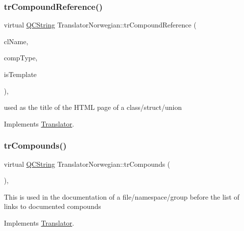 \subsubsection{\texorpdfstring{trCompoundReference()}{trCompoundReference()}}
{\footnotesize\ttfamily virtual \mbox{\hyperlink{class_q_c_string}{Q\+C\+String}} Translator\+Norwegian\+::tr\+Compound\+Reference (\begin{DoxyParamCaption}\item[{const char $\ast$}]{cl\+Name,  }\item[{\mbox{\hyperlink{class_class_def_ae70cf86d35fe954a94c566fbcfc87939}{Class\+Def\+::\+Compound\+Type}}}]{comp\+Type,  }\item[{bool}]{is\+Template }\end{DoxyParamCaption})\hspace{0.3cm}{\ttfamily [inline]}, {\ttfamily [virtual]}}

used as the title of the H\+T\+ML page of a class/struct/union 

Implements \mbox{\hyperlink{class_translator}{Translator}}.

\mbox{\label{class_translator_norwegian_a78c133664ddcd9b886e4fd65be643e93}} 
\subsubsection{\texorpdfstring{trCompounds()}{trCompounds()}}
{\footnotesize\ttfamily virtual \mbox{\hyperlink{class_q_c_string}{Q\+C\+String}} Translator\+Norwegian\+::tr\+Compounds (\begin{DoxyParamCaption}{ }\end{DoxyParamCaption})\hspace{0.3cm}{\ttfamily [inline]}, {\ttfamily [virtual]}}

This is used in the documentation of a file/namespace/group before the list of links to documented compounds 

Implements \mbox{\hyperlink{class_translator}{Translator}}.

\mbox{\label{class_translator_norwegian_a69a708b9c415de38064383a2f190b305}} 
